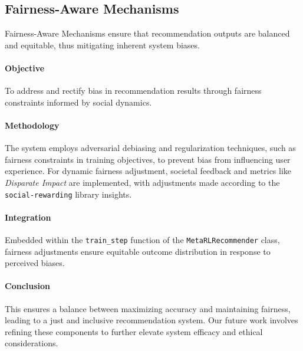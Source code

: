 \subsection{Fairness-Aware Mechanisms}

Fairness-Aware Mechanisms ensure that recommendation outputs are balanced and equitable, thus mitigating inherent system biases.

\paragraph{Objective}
To address and rectify bias in recommendation results through fairness constraints informed by social dynamics.

\paragraph{Methodology}
The system employs adversarial debiasing and regularization techniques, such as fairness constraints in training objectives, to prevent bias from influencing user experience. For dynamic fairness adjustment, societal feedback and metrics like \emph{Disparate Impact} are implemented, with adjustments made according to the \texttt{social-rewarding} library insights.

\paragraph{Integration}
Embedded within the \texttt{train\_step} function of the \texttt{MetaRLRecommender} class, fairness adjustments ensure equitable outcome distribution in response to perceived biases.

\paragraph{Conclusion}
This ensures a balance between maximizing accuracy and maintaining fairness, leading to a just and inclusive recommendation system. Our future work involves refining these components to further elevate system efficacy and ethical considerations.

